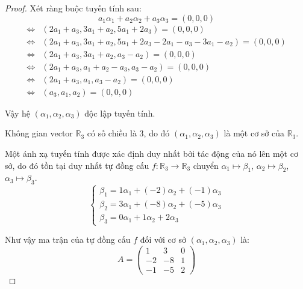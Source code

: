 \documentclass[class=linearalgebra,crop=false]{standalone}
\begin{document}
\begin{proof}
    Xét ràng buộc tuyến tính sau:
    \[
        a_{1}\alpha_{1} + a_{2}\alpha_{2} + a_{3}\alpha_{3} = (0,0,0)
    \]
    \begin{align*}
        \Leftrightarrow & (2a_{1} + a_{3}, 3a_{1} + a_{2}, 5a_{1} + 2a_{3}) = (0,0,0)                                   \\
        \Leftrightarrow & (2a_{1} + a_{3}, 3a_{1} + a_{2}, 5a_{1} + 2a_{3} - 2a_{1} - a_{3} - 3a_{1} - a_{2}) = (0,0,0) \\
        \Leftrightarrow & (2a_{1} + a_{3}, 3a_{1} + a_{2}, a_{3} - a_{2}) = (0,0,0)                                     \\
        \Leftrightarrow & (2a_{1} + a_{3}, a_{1} + a_{2} - a_{3}, a_{3} - a_{2}) = (0,0,0)                              \\
        \Leftrightarrow & (2a_{1} + a_{3}, a_{1}, a_{3} - a_{2}) = (0,0,0)                                              \\
        \Leftrightarrow & (a_{3}, a_{1}, a_{2}) = (0,0,0)
    \end{align*}
    \par Vậy hệ $(\alpha_{1}, \alpha_{2}, \alpha_{3})$ độc lập tuyến tính.
    \par Không gian vector $\mathbb{R}_{3}$ có số chiều là 3, do đó $(\alpha_{1}, \alpha_{2}, \alpha_{3})$ là một cơ sở của $\mathbb{R}_{3}$.
    \par Một ánh xạ tuyến tính được xác định duy nhất bởi tác động của nó lên một cơ sở, do đó tồn tại duy nhất tự đồng cấu $f: \mathbb{R}_{3}\to\mathbb{R}_{3}$ chuyển $\alpha_{1}\mapsto\beta_{1}$, $\alpha_{2}\mapsto\beta_{2}$, $\alpha_{3}\mapsto\beta_{3}$.
    \[
        \begin{cases}
            \beta_{1} = 1\alpha_{1} + (-2)\alpha_{2} + (-1)\alpha_{3} \\
            \beta_{2} = 3\alpha_{1} + (-8)\alpha_{2} + (-5)\alpha_{3} \\
            \beta_{3} = 0\alpha_{1} + 1\alpha_{2} + 2\alpha_{3}
        \end{cases}
    \]
    \par Như vậy ma trận của tự đồng cấu $f$ đối với cơ sở $(\alpha_{1}, \alpha_{2}, \alpha_{3})$ là:
    \[
        A =
        \begin{pmatrix}
            1  & 3  & 0 \\
            -2 & -8 & 1 \\
            -1 & -5 & 2
        \end{pmatrix}
\]
\end{proof}
\end{document}
